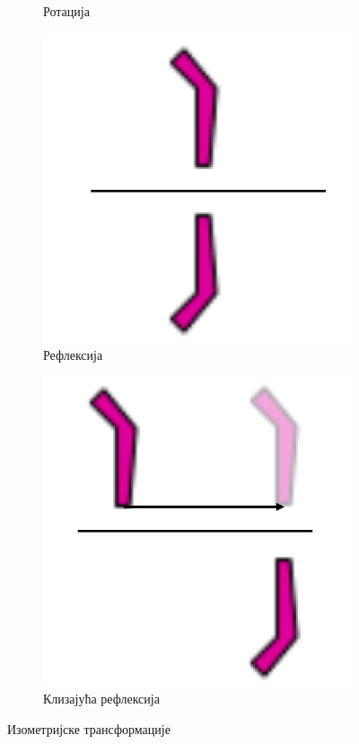 \documentclass[12pt]{article}
\begin{document}
\begin{figure}[H]
\begin{subfigure}[b]{0.24\textwidth}
    \caption{Ротација \newline } \label{fig:rot}
    \end{subfigure}
  \begin{subfigure}[b]{0.24\textwidth}
    \includegraphics[width=.9\textwidth]{crtez_refleksija.png}
    \caption{Рефлексија \newline      }
    \label{fig:refl}
    
    
\end{subfigure}
\begin{subfigure}[b]{0.24\textwidth}
    \includegraphics[width=.9\textwidth]{crtez_klizajuca.png}
    \caption{Клизајућа \newline рефлексија}
    \label{fig:kliz}
    
\end{subfigure}
\caption{Изометријске трансформације}

\end{figure}
\end{document}
